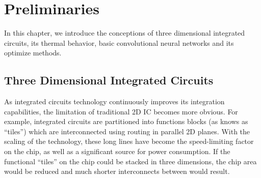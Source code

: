 
\chapter{Preliminaries}

In this chapter, we introduce the conceptions of three dimensional integrated circuits, its thermal behavior, 
basic convolutional neural networks and its optimize methods.

\section{Three Dimensional Integrated Circuits} \label{sec::3DIC}

As integrated circuits technology continuously improves its integration capabilities,
the limitation of traditional 2D IC becomes more obvious.
For example, integrated circuits are partitioned into functions blocks (as knows as ``tiles'')
which are interconnected using routing in parallel 2D planes.
With the scaling of the technology, these long lines
have become the speed-limiting factor on the chip, as well as a significant
source for power consumption. If the functional ``tiles'' on the
chip could be stacked in three dimensions, the chip area would be
reduced and much shorter interconnects between would result.

